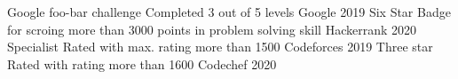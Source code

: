 
\begin{cvhonors}
 
    \cvhonor
   {Google foo-bar challenge}
    {Completed 3 out of 5 levels}
    {Google}
    {2019}
   \cvhonor
    {Six Star Badge}
    {for scroing more than 3000 points in problem solving skill}
    {Hackerrank}
    {2020}
     \cvhonor
    {Specialist Rated}
    {with max. rating more than 1500}
    {Codeforces}
    {2019}
    \cvhonor
    {Three star Rated}
    {with rating more than 1600}
    {Codechef}
    {2020}
\end{cvhonors}


